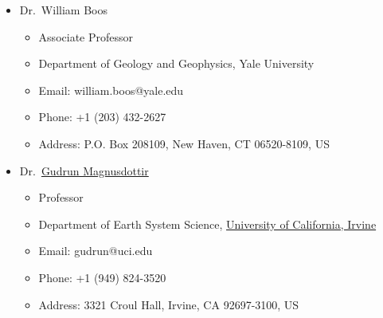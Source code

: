 \documentclass[11pt]{article}
\newcommand{\uci}{\href{http://www.uci.edu}{University of California, Irvine}}
\newcommand{\gudrun}{\href{http://sites.uci.edu/magnusdottir}{Gudrun Magnusdottir}}
\begin{document}
\begin{itemize}[leftmargin=4ex, itemsep=1ex]
	\item Dr.~William Boos
	\begin{itemize}
		\item Associate Professor
		\item Department of Geology and Geophysics, Yale University
    		\item Email: william.boos@yale.edu
		\item Phone: +1 (203) 432-2627
    	 	\item Address: P.O. Box 208109, New Haven, CT 06520-8109, US 
	 	\end{itemize}
		
	\item Dr.~\gudrun{}
	\begin{itemize}
		\item Professor
		\item Department of Earth System Science, \uci{}
    		\item Email: gudrun@uci.edu
		\item Phone: +1 (949) 824-3520
    	 	\item Address: 3321 Croul Hall, Irvine, CA 92697-3100, US 
	 	\end{itemize}
	 
	 \end{itemize}
 
\end{document}
